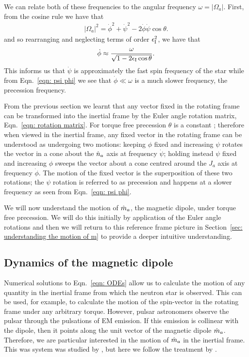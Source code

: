 \documentclass[../full_thesis/full_thesis.tex]{subfiles}
\begin{document}
We can relate both of these frequencies to the angular frequency $\omega = |\Omega_a|$.
First, from the cosine rule we have that
\begin{align}
|\Omega_a|^{2} = \dot{\phi}^{2}+\dot{\psi}^{2} - 2\dot{\phi}\dot{\psi}\cos\theta.
\end{align}
and so rearranging and neglecting terms of order $\epsilon_{\mathrm{I}}^{2}$, we have that
\begin{align}
\dot{\phi} \approx \frac{\omega}{\sqrt{1- 2\epsilon_{\mathrm{I}}\cos\theta}}.
\label{eqn: phi dot}
\end{align}
This informs us that $\dot{\psi}$ is approximately the fast spin frequency
of the star while from Eqn.~\eqref{eqn: psi phi} we see that $\dot{\phi} \ll \omega$
is a much slower frequency, the precession frequency.

From the previous section we learnt that any vector fixed in the rotating frame
can be transformed into the inertial frame by the Euler angle rotation matrix,
Eqn.~\eqref{eqn: rotation matrix}. For torque free precession $\theta$ is a
constant \citep{Landau1969}; therefore when viewed in the inertial frame, any
fixed vector in the rotating frame can be understood as undergoing two motions:
keeping $\phi$ fixed and increasing $\psi$ rotates the vector in a cone
about the $\hat{n}_{a}$ axis at frequency $\dot{\psi}$; holding
instead $\psi$ fixed and increasing $\phi$ sweeps the vector about a cone
centred around the $\hat{J}_a$ axis at frequency
$\dot{\phi}$. The motion of the fixed vector is the superposition of these two
rotations; the $\psi$ rotation is referred to as precession and happens at a
slower frequency as seen from Eqn.~\eqref{eqn: psi phi}.

We will now understand the motion of $\hat{m}_a$, the magnetic dipole, under torque
free precession. We will do this initially by application of the Euler angle
rotations and then we will return to this reference frame picture in
Section~\ref{sec: understanding the motion of m} to provide a deeper intuitive
understanding.

\subsection{Dynamics of the magnetic dipole}

Numerical solutions to Eqn.~\eqref{eqn: ODEs} allow us to calculate the motion
of any quantity in the inertial frame from which the neutron star is observed.
This can be used, for example, to calculate the motion of the spin-vector in the
rotating frame under any arbitrary torque. However, pulsar astronomers observe the pulsar
through the pulsations of EM emission. If this emission is collinear with the
dipole, then it points along the unit vector of the magnetic dipole $\hat{m}_a$. Therefore,
we are particular interested in the motion of $\hat{m}_a$ in the inertial frame. This
was system was studied by \citet{bisnovatyi1990model}, but here we follow the
treatment by \citet{Jones2001}.
\end{document}
